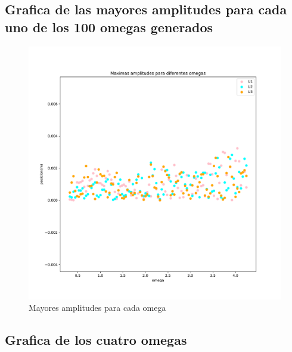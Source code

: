 \documentclass[11pt,letterpaper]{exam}
\begin{document}
\subsection{Grafica de las mayores amplitudes para cada uno de los 100 omegas generados}
\begin{figure}[H]
    \centering
    \includegraphics[width=1.1\textwidth]{plot_omegas.pdf}
    \caption{Mayores amplitudes para cada omega}
    \label{fig:my_label}
\end{figure}
\subsection{Grafica de los cuatro omegas}
\end{document}
